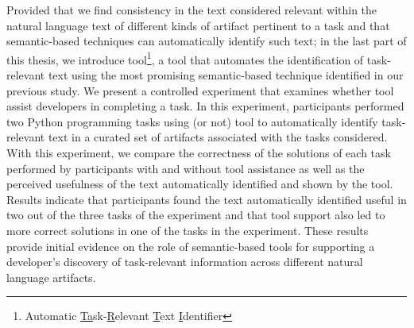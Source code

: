 







Provided that we find consistency in the text considered relevant within the natural language text of different kinds of artifact pertinent to a task and that semantic-based techniques can automatically identify such text; in the last part of this thesis, 
we introduce \acs{tool}\footnote{
    Automatic \underline{Ta}sk-\underline{R}elevant \underline{T}ext \underline{I}dentifier
}, a tool that automates the identification of task-relevant text using the most promising semantic-based technique identified in our previous study.
We present a controlled experiment that examines whether \acs{tool} 
assist developers in completing a task. 
In this experiment, participants 
performed two Python programming tasks using (or not) \acs{tool}
to automatically identify task-relevant text 
in a curated set of artifacts associated with the tasks considered. 
With this experiment, we compare the correctness of the solutions of each task 
performed by participants with and without tool assistance
as well as the perceived usefulness of the text automatically identified and shown by the tool. 
Results indicate that participants found the text automatically identified
useful in two out of the three tasks of the experiment
and that tool support also led to more correct solutions 
in one of the tasks in the experiment. These results provide
initial evidence on the role of semantic-based tools 
for supporting a developer's discovery of task-relevant information
across different natural language artifacts.









